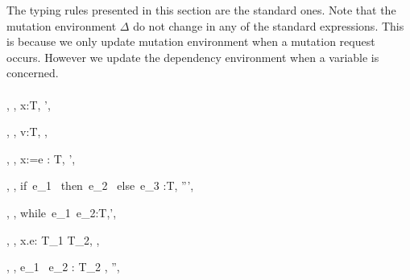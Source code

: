 The typing rules presented in this section are the standard ones. Note that the mutation environment $\Delta$ do not change in any of the standard expressions. This is because we only update mutation environment when a mutation request occurs. However we update the dependency environment when a variable is concerned. 
\ \\
\ \\
    {\Gamma, \Lambda, \Delta \vdash x:T, \Lambda', \Delta}   

    {\Gamma, \Lambda, \Delta \vdash v:T, \Lambda, \Delta}

    {
    	\Gamma, \Lambda, \Delta \vdash x:=e : T, \Lambda ', \Delta
    }
   
    {\Gamma, \Lambda, \Delta \vdash if\ e_1 \ then\ e_2 \ else\ e_3 :T, \Lambda ''', \Delta}


    {\Gamma, \Lambda, \Delta \vdash while\ e_1\ e_2:T,\Lambda', \Delta}


    {\Gamma, \Lambda, \Delta \vdash \lambda x.e: T_1 \rightarrow T_2, \Lambda, \Delta}
    
    {\Gamma, \Lambda, \Delta \vdash e_1 \ e_2 : T_2 , \Lambda'', \Delta}
    
